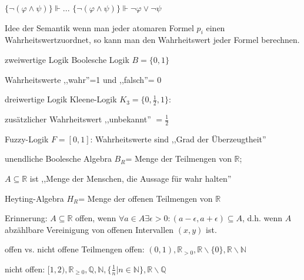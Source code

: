 \documentclass[avery5371]{flashcards}
\begin{document}
\begin{flashcard}{ $\{\lnot(\varphi\wedge\psi)\}\Vdash ...$ }
    $\{\lnot(\varphi\wedge\psi)\}\Vdash\lnot\varphi\vee\lnot\psi$
\end{flashcard}

\begin{flashcard}[ Semantik ]{ Idee der Semantik }
    wenn man jeder atomaren Formel $p_i$ einen Wahrheitswertzuordnet, so kann man den Wahrheitswert jeder Formel berechnen.
\end{flashcard}

\begin{flashcard}[ Semantik ]{ zweiwertige Logik }
    Boolesche Logik $B=\{0,1\}$

    Wahrheitswerte ,,wahr''=1 und ,,falsch''= 0
\end{flashcard}

\begin{flashcard}[ Semantik ]{ dreiwertige Logik }
    Kleene-Logik $K_3=\{0,\frac{1}{2},1\}$:

    zusätzlicher Wahrheitswert ,,unbekannt'' $=\frac{1}{2}$
\end{flashcard}

\begin{flashcard}[ Semantik ]{ Fuzzy-Logik }
    $F=[0,1]$: Wahrheitswerte sind ,,Grad der Überzeugtheit''
\end{flashcard}

\begin{flashcard}[ Semantik ]{ unendliche Boolesche Algebra }
    $B_R$= Menge der Teilmengen von $\mathbb{R}$;

    $A\subseteq\mathbb{R}$ ist ,,Menge der Menschen, die Aussage für wahr halten''
\end{flashcard}

\begin{flashcard}[ Semantik ]{ Heyting-Algebra }
    $H_R$= Menge der offenen Teilmengen von $\mathbb{R}$

    Erinnerung: $A\subseteq\mathbb{R}$ offen, wenn $\forall a\in A\exists\epsilon >0:(a-\epsilon,a+\epsilon)\subseteq A$, d.h. wenn $A$ abzählbare Vereinigung von offenen Intervallen $(x,y)$ ist.
\end{flashcard}

\begin{flashcard}[ Semantik ]{ offen vs. nicht offene Teilmengen }
    offen: $(0,1), \mathbb{R}_{>0}, \mathbb{R}\backslash\{0\}, \mathbb{R}\backslash\mathbb{N}$

    nicht offen: $[1,2), \mathbb{R}_{\geq 0}, \mathbb{Q}, \mathbb{N}, \{\frac{1}{n} | n\in\mathbb{N}\}, \mathbb{R}\backslash\mathbb{Q}$
\end{flashcard}
\end{document}

